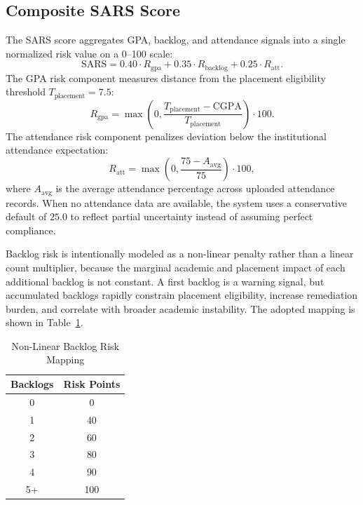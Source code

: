 \documentclass[conference]{IEEEtran}
\begin{document}
\subsection{Composite SARS Score}
The SARS score aggregates GPA, backlog, and attendance signals into a single normalized risk value on a 0--100 scale:
\begin{equation}
\mathrm{SARS} = 0.40 \cdot R_{\mathrm{gpa}} + 0.35 \cdot R_{\mathrm{backlog}} + 0.25 \cdot R_{\mathrm{att}}.
\label{eq:sars}
\end{equation}
The GPA risk component measures distance from the placement eligibility threshold $T_{\mathrm{placement}} = 7.5$:
\begin{equation}
R_{\mathrm{gpa}} = \max\left(0, \frac{T_{\mathrm{placement}} - \mathrm{CGPA}}{T_{\mathrm{placement}}}\right) \cdot 100.
\label{eq:gpa-risk}
\end{equation}
The attendance risk component penalizes deviation below the institutional attendance expectation:
\begin{equation}
R_{\mathrm{att}} = \max\left(0, \frac{75 - A_{\mathrm{avg}}}{75}\right) \cdot 100,
\label{eq:attendance-risk}
\end{equation}
where $A_{\mathrm{avg}}$ is the average attendance percentage across uploaded attendance records. When no attendance data are available, the system uses a conservative default of $25.0$ to reflect partial uncertainty instead of assuming perfect compliance.

Backlog risk is intentionally modeled as a non-linear penalty rather than a linear count multiplier, because the marginal academic and placement impact of each additional backlog is not constant. A first backlog is a warning signal, but accumulated backlogs rapidly constrain placement eligibility, increase remediation burden, and correlate with broader academic instability. The adopted mapping is shown in Table~\ref{tab:backlog-risk}.

\begin{table}[t]
\caption{Non-Linear Backlog Risk Mapping}
\label{tab:backlog-risk}
\centering
\begin{tabular}{cc}
\toprule
Backlogs & Risk Points \\
\midrule
0 & 0 \\
1 & 40 \\
2 & 60 \\
3 & 80 \\
4 & 90 \\
5+ & 100 \\
\bottomrule
\end{tabular}
\end{table}
\end{document}
